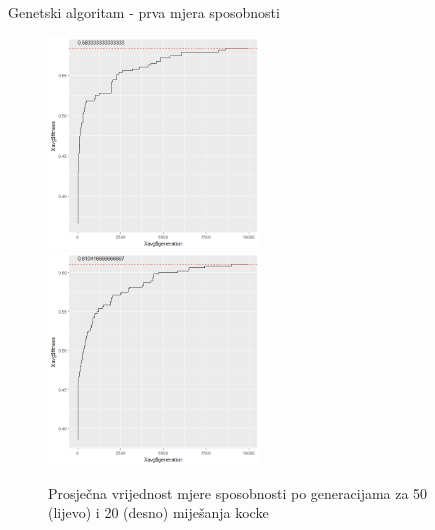 \documentclass{beamer}
\begin{document}
  \begin{frame}{Genetski algoritam - prva mjera sposobnosti}
  		\begin{figure}[h]
			\centering
			\includegraphics[width=0.5\textwidth]{../../results/sumsides_fitness/50_scrambles/cross0,5greedy10mut20.png}
			\includegraphics[width=0.5\textwidth]{../../results/sumsides_fitness/20_scrambles/cross0,5greedy10mut20.png}
			\caption{Prosječna vrijednost mjere sposobnosti po generacijama za 50 (lijevo) i 20 (desno) miješanja kocke }
		\end{figure}
  \end{frame}
\end{document}
